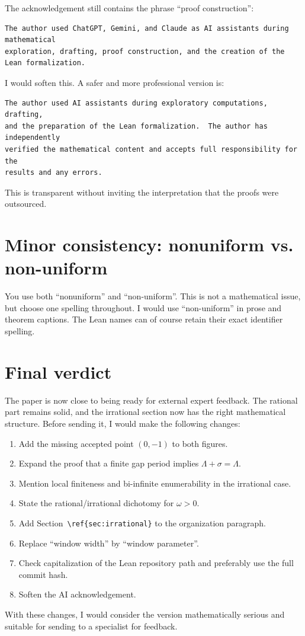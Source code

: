 \documentclass[11pt]{article}
\begin{document}
The acknowledgement still contains the phrase ``proof construction'':

\begin{lstlisting}
The author used ChatGPT, Gemini, and Claude as AI assistants during mathematical
exploration, drafting, proof construction, and the creation of the Lean formalization.
\end{lstlisting}

I would soften this.  A safer and more professional version is:

\begin{lstlisting}
The author used AI assistants during exploratory computations, drafting,
and the preparation of the Lean formalization.  The author has independently
verified the mathematical content and accepts full responsibility for the
results and any errors.
\end{lstlisting}

This is transparent without inviting the interpretation that the proofs were
outsourced.

\section{Minor consistency: nonuniform vs. non-uniform}

You use both ``nonuniform'' and ``non-uniform''.  This is not a mathematical
issue, but choose one spelling throughout.  I would use ``non-uniform'' in
prose and theorem captions.  The Lean names can of course retain their exact
identifier spelling.

\section*{Final verdict}

The paper is now close to being ready for external expert feedback.  The
rational part remains solid, and the irrational section now has the right
mathematical structure.  Before sending it, I would make the following changes:

\begin{enumerate}[label=\arabic*.]
    \item Add the missing accepted point \((0,-1)\) to both figures.
    \item Expand the proof that a finite gap period implies
          \(\Lambda+\sigma=\Lambda\).
    \item Mention local finiteness and bi-infinite enumerability in the
          irrational case.
    \item State the rational/irrational dichotomy for \(\omega>0\).
    \item Add Section~\texttt{\textbackslash ref\{sec:irrational\}} to the
          organization paragraph.
    \item Replace ``window width'' by ``window parameter''.
    \item Check capitalization of the Lean repository path and preferably use
          the full commit hash.
    \item Soften the AI acknowledgement.
\end{enumerate}

With these changes, I would consider the version mathematically serious and
suitable for sending to a specialist for feedback.
\end{document}
